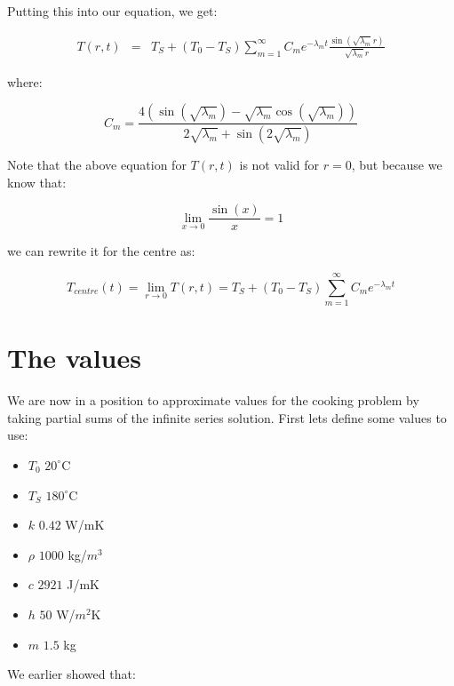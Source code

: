 \documentclass{report}
\begin{document}
Putting this into our equation, we get:\bigskip

\begin{eqnarray*} 
T(r, t) & = & T_S + (T_0 - T_S) \sum_{m = 1}^{\infty} C_m  e^{-\lambda_m t} \frac{\sin(\sqrt{\lambda_m}r)}{\sqrt{\lambda_m}r}
\end{eqnarray*}\medskip

where:\bigskip

\[ 
C_m = \frac{4 (\sin(\sqrt{\lambda_m}) - \sqrt{\lambda_m}\cos(\sqrt{\lambda_m}))} {2\sqrt{\lambda_m} + \sin(2\sqrt{\lambda_m})}
\]\medskip

Note that the above equation for $T(r, t)$ is not valid for $r = 0$, but because we know that:\bigskip

\[
\lim_{x \to 0} \frac{\sin(x)}{x} = 1
\]\medskip

we can rewrite it for the centre as:\bigskip

\[
T_{centre}(t) = \lim_{r \to 0} T(r, t) = T_S +(T_0 - T_S) \sum_{m = 1}^{\infty} C_m  e^{-\lambda_m t} 
\]


\section{The values}

We are now in a position to approximate values for the cooking problem by taking partial sums of the infinite series 
solution. First lets define some values to use:\bigskip

\begin{itemize}

\item $T_0$    \tab $20^{\circ}\mathrm{C}$

\item $T_S$    \tab $180^{\circ}\mathrm{C}$ 

\item $k$      \tab $0.42$ W/mK

\item $\rho$   \tab $1000$ kg/$m^3$

\item $c$      \tab $2921$ J/mK

\item $h$      \tab $50$ W/$m^2$K

\item $m$      \tab $1.5$ kg

\end{itemize}\medskip

We earlier showed that:\bigskip
\end{document}
